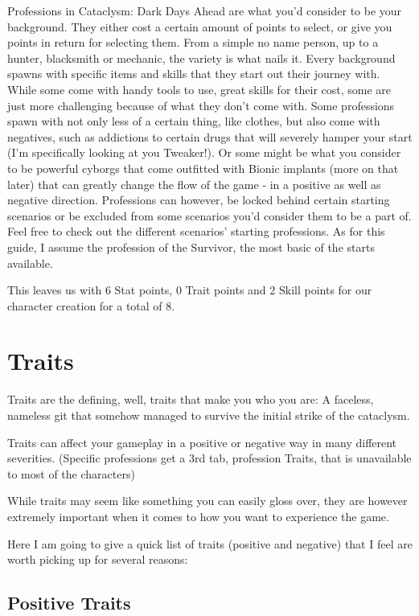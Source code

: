 \documentclass[11pt]{report}
\begin{document}
Professions in Cataclysm: Dark Days Ahead are what you'd consider to be your background. They either cost a certain amount of points to select, or give you points in return for selecting them. From a simple no name person, up to a hunter, blacksmith or mechanic, the variety is what nails it. Every background spawns with specific items and skills that they start out their journey with. While some come with handy tools to use, great skills for their cost, some are just more challenging because of what they don't come with. Some professions spawn with not only less of a certain thing, like clothes, but also come with negatives, such as addictions to certain drugs that will severely hamper your start (I'm specifically looking at you Tweaker!). Or some might be what you consider to be powerful cyborgs that come outfitted with Bionic implants (more on that later) that can greatly change the flow of the game - in a positive as well as negative direction. Professions can however, be locked behind certain starting scenarios or be excluded from some scenarios you'd consider them to be a part of. Feel free to check out the different scenarios' starting professions. As for this guide, I assume the profession of the Survivor, the most basic of the starts available.

This leaves us with 6 Stat points, 0 Trait points and 2 Skill points for our character creation for a total of 8.

\section{Traits}

Traits are the defining, well, traits that make you who you are: A faceless, nameless git that somehow managed to survive the initial strike of the cataclysm.

Traits can affect your gameplay in a positive or negative way in many different severities. (Specific professions get a 3rd tab, profession Traits, that is unavailable to most of the characters)

While traits may seem like something you can easily gloss over, they are however extremely important when it comes to how you want to experience the game.

Here I am going to give a quick list of traits (positive and negative) that I feel are worth picking up for several reasons:

\subsection{Positive Traits}
\end{document}
